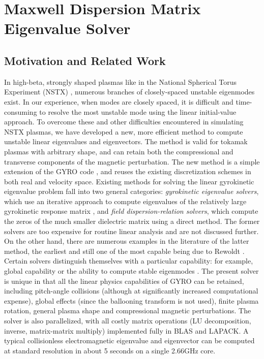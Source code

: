 \chapter{Maxwell Dispersion Matrix Eigenvalue Solver}

\section{Motivation and Related Work}

In high-beta, strongly shaped plasmas like in the National Spherical Torus
Experiment (NSTX) \cite{ono:2000}, numerous 
branches of closely-spaced unstable eigenmodes exist.  In our 
experience, when modes are closely spaced, it is difficult 
and time-consuming to resolve the most unstable mode using 
the linear initial-value approach.  To overcome these and 
other difficulties encountered in simulating NSTX plasmas,  
we have developed a new, more efficient method to compute 
unstable linear eigenvalues and eigenvectors.  The method is 
valid for tokamak plasmas with arbitrary shape, and can retain 
both the compressional and transverse components of the magnetic 
perturbation.  The new method is a simple extension of the GYRO 
code \cite{candy:2003}, and reuses the existing discretization schemes in both 
real and velocity space.  Existing methods for solving the 
linear gyrokinetic eigenvalue problem fall into two general 
categories: {\it gyrokinetic eigenvalue solvers}, which use 
an iterative approach to compute eigenvalues of the relatively 
large gyrokinetic response matrix \cite{kammerer:2008,bass:2009}, 
and {\it field dispersion-relation solvers}, which compute the 
zeros of the much smaller dielectric matrix using a direct method. 
The former solvers are too expensive for routine linear 
analysis and are not discussed further.  On the other hand, 
there are numerous examples in the literature of the latter 
method, the earliest and still one of the most capable being 
due to Rewoldt \cite{rewoldt:1981}.  Certain solvers distinguish
themselves with a particular capability: for example, global 
capability \cite{falchetto:2003} or the ability to compute 
stable eigenmodes \cite{sugama:1999}.  The present solver is 
unique in that all the linear physics capabilities of GYRO 
can be retained, including pitch-angle collisions (although 
at significantly increased computational expense), global 
effects (since the ballooning transform is not used), finite 
plasma rotation, general plasma shape and compressional magnetic 
perturbations.  The solver is also parallelized, with all costly 
matrix operations (LU decomposition, inverse, matrix-matrix multiply) 
implemented fully in BLAS and LAPACK.  A typical collisionless 
electromagnetic eigenvalue and eigenvector can be computed at 
standard resolution in about 5 seconds on a single 2.66GHz core.  

